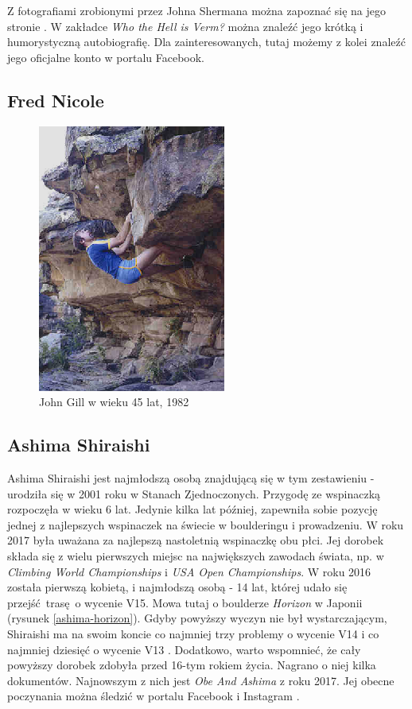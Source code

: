 \documentclass{article}
\begin{document}
Z fotografiami zrobionymi przez Johna Shermana można zapoznać się na jego stronie \cite{vermphoto}. W zakładce \textit{Who the Hell is Verm?} można znaleźć jego krótką i humorystyczną autobiografię. Dla zainteresowanych, tutaj \cite{vermfb} możemy z kolei znaleźć jego oficjalne konto w portalu Facebook. 

\subsection{Fred Nicole}

\begin{figure}[!htbp]
	\begin{center}
		\includegraphics[width=0.5\linewidth]{images/gill-2.eps}
	\end{center}
	\caption{John Gill w wieku 45 lat, 1982 \cite{gill-website}}
	\label{gill-1}
\end{figure}

\subsection{Ashima Shiraishi}
Ashima Shiraishi jest najmłodszą osobą znajdującą się w tym zestawieniu - urodziła się w 2001 roku w Stanach Zjednoczonych. Przygodę ze wspinaczką rozpoczęła w wieku 6 lat. Jedynie kilka lat później, zapewniła sobie pozycję jednej z najlepszych wspinaczek na świecie w boulderingu i prowadzeniu. W roku 2017 była uważana za najlepszą nastoletnią wspinaczkę obu płci. Jej dorobek składa się z wielu pierwszych miejsc na największych zawodach świata, np. w \textit{Climbing World Championships} i \textit{USA Open Championships}. W roku 2016 została pierwszą kobietą, i najmłodszą osobą - 14 lat, której udało się przejść trasę o wycenie V15. Mowa tutaj o boulderze \textit{Horizon} w Japonii (rysunek \ref{ashima-horizon}). Gdyby powyższy wyczyn nie był wystarczającym, Shiraishi ma na swoim koncie co najmniej trzy problemy o wycenie V14 i co najmniej dziesięć o wycenie V13 \cite{wiki-ashima}. Dodatkowo, warto wspomnieć, że cały powyższy dorobek zdobyła przed 16-tym rokiem życia. Nagrano o niej kilka dokumentów. Najnowszym z nich jest \textit{Obe And Ashima} z roku 2017. Jej obecne poczynania można śledzić w portalu Facebook \cite{ashima-fb} i Instagram \cite{ashima-ig}.
\end{document}
